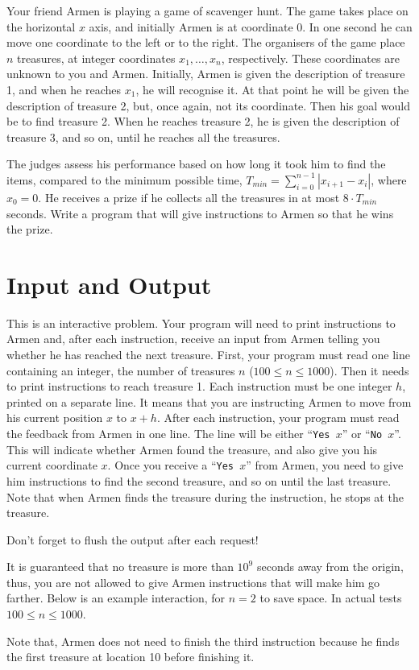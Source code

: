 
Your friend Armen is playing a game of scavenger hunt.
The game takes place on the horizontal $x$ axis, and initially Armen is at coordinate $0$.
In one second he can move one coordinate to the left or to the right.
The organisers of the game place $n$ treasures, at integer coordinates $x_1,\dots, x_n$, respectively.
These coordinates are unknown to you and Armen.
Initially, Armen is given the description of treasure 1, and when he reaches $x_1$, he will recognise it.
At that point he will be given the description of treasure 2, but, once again, not its coordinate.
Then his goal would be to find treasure 2.
When he reaches treasure 2, he is given the description of treasure 3, and so on, until he reaches all the treasures.

The judges assess his performance based on how long it took him to find the items, compared to the minimum possible time, $T_{min} = \sum_{i = 0}^{n-1}|x_{i + 1} - x_i|$, where $x_0 = 0$.
He receives a prize if he collects all the treasures in at most $8 \cdot T_{min}$ seconds.
Write a program that will give instructions to Armen so that he wins the prize.

\section*{Input and Output}
This is an interactive problem.
Your program will need to print instructions to Armen and, after each instruction, receive an input from Armen telling you whether he has reached the next treasure.
First, your program must read one line containing an integer, the number of treasures $n$ ($100 \leq n \leq 1000$).
Then it needs to print instructions to reach treasure 1.
Each instruction must be one integer $h$, printed on a separate line.
It means that you are instructing Armen to move from his current position $x$ to $x + h$.
After each instruction, your program must read the feedback from Armen in one line.
The line will be either ``\texttt{Yes }$x$'' or ``\texttt{No }$x$''.
This will indicate whether Armen found the treasure, and also give you his current coordinate $x$.
Once you receive a ``\texttt{Yes }$x$'' from Armen, you need to give him instructions to find the second treasure, and so on until the last treasure.
Note that when Armen finds the treasure during the instruction, he stops at the treasure.

Don’t forget to flush the output after each request!

It is guaranteed that no treasure is more than $10^9$ seconds away from the origin, thus, you are not allowed to give Armen instructions that will make him go farther.
Below is an example interaction, for $n = 2$ to save space.
In actual tests $100 \leq n \leq 1000$.

{
\renewcommand{\sampleinputname}{Armen's feedback}
\renewcommand{\sampleoutputname}{Your instructions}
}

Note that, Armen does not need to finish the third instruction because he finds the first treasure at location 10 before finishing it.

